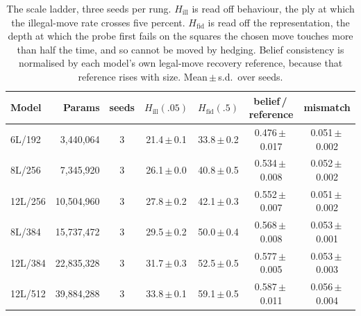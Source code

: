 \begin{table}[t]
\centering\small
\caption{The scale ladder, three seeds per rung. $H_{\mathrm{ill}}$ is read
off behaviour, the ply at which the illegal-move rate crosses five percent.
$H_{\mathrm{fid}}$ is read off the representation, the depth at which the
probe first fails on the squares the chosen move touches more than half the
time, and so cannot be moved by hedging. Belief consistency is normalised by
each model's own legal-move recovery reference, because that reference rises with
size. Mean\,$\pm$\,s.d.\ over seeds.}
\label{tab:scale}
\begin{tabular}{lrccccc}
\toprule
Model & Params & seeds & $H_{\mathrm{ill}}(.05)$ & $H_{\mathrm{fid}}(.5)$ & belief\,/\,reference & mismatch \\
\midrule
6L/192 & 3{,}440{,}064 & 3 & 21.4\,$\pm$\,0.1 & 33.8\,$\pm$\,0.2 & 0.476\,$\pm$\,0.017 & 0.051\,$\pm$\,0.002 \\
8L/256 & 7{,}345{,}920 & 3 & 26.1\,$\pm$\,0.0 & 40.8\,$\pm$\,0.5 & 0.534\,$\pm$\,0.008 & 0.052\,$\pm$\,0.002 \\
12L/256 & 10{,}504{,}960 & 3 & 27.8\,$\pm$\,0.2 & 42.1\,$\pm$\,0.3 & 0.552\,$\pm$\,0.007 & 0.051\,$\pm$\,0.002 \\
8L/384 & 15{,}737{,}472 & 3 & 29.5\,$\pm$\,0.2 & 50.0\,$\pm$\,0.4 & 0.568\,$\pm$\,0.008 & 0.053\,$\pm$\,0.001 \\
12L/384 & 22{,}835{,}328 & 3 & 31.7\,$\pm$\,0.3 & 52.5\,$\pm$\,0.5 & 0.577\,$\pm$\,0.005 & 0.053\,$\pm$\,0.003 \\
12L/512 & 39{,}884{,}288 & 3 & 33.8\,$\pm$\,0.1 & 59.1\,$\pm$\,0.5 & 0.587\,$\pm$\,0.011 & 0.056\,$\pm$\,0.004 \\
\bottomrule
\end{tabular}
\end{table}
